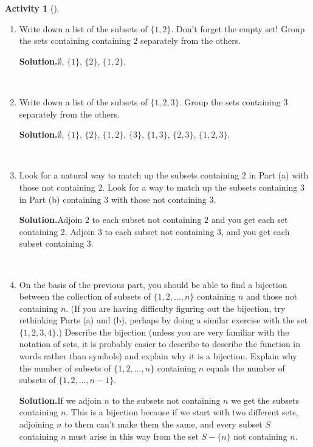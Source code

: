 \documentclass[10pt,]{book}
\theoremstyle{plain}
\theoremstyle{definition}
\newtheorem{activity}[project]{Activity}
\numberwithin{equation}{chapter}
\begin{document}
\begin{activity}[]\label{subsetsbysmallestcounterexample}
~\par
\begin{enumerate}[label=(\alph*)]
 \item Write down a list of the subsets of \(\{ 1, 2 \}\). Don't forget the empty set! Group the sets containing containing 2 separately from the others.%
\par\medskip\noindent%
\textbf{Solution.}\quad \(\emptyset\), \(\{1\}\), \(\{2\}\), \(\{1, 2\}\).%

~\par
\item Write down a list of the subsets of \(\{ 1, 2, 3 \}\). Group the sets containing 3 separately from the others.%
\par\medskip\noindent%
\textbf{Solution.}\quad \(\emptyset\), \(\{1\}\), \(\{2\}\), \(\{1, 2\}\), \(\{3\}\), \(\{1,3\}\), \(\{2,3\}\), \(\{1,2,3\}\).%

~\par
\item Look for a natural way to match up the subsets containing 2 in Part (a) with those not containing 2. Look for a way to match up the subsets containing 3 in Part (b) containing 3 with those not containing 3.%
\par\medskip\noindent%
\textbf{Solution.}\quad Adjoin \(2\) to each subset not containing \(2\) and you get each set containing 2. Adjoin 3 to each subset not containing 3, and you get each subset containing 3.%

~\par
\item On the basis of the previous part, you should be able to find a bijection between the collection of subsets of \(\{1, 2, \ldots , n \}\) containing \(n\) and those not containing \(n\). (If you are having difficulty figuring out the bijection, try rethinking Parts (a) and (b), perhaps by doing a similar exercise with the set \(\{1,2,3,4\}\).) Describe the bijection (unless you are very familiar with the notation of sets, it is probably easier to describe to describe the function in words rather than symbols) and explain why it is a bijection. Explain why the number of subsets of \(\{ 1, 2, \ldots , n \}\) containing \(n\) equals the number of subsets of \(\{ 1, 2, \ldots, n-1 \}\).%
\par\medskip\noindent%
\textbf{Solution.}\quad If we adjoin \(n\) to the subsets not containing \(n\) we get the subsets containing \(n\). This is a bijection because if we start with two different sets, adjoining \(n\) to them can't make them the same, and every subset \(S\) containing \(n\) must arise in this way from the set \(S-\{n\}\) not containing \(n\).%


\end{enumerate}
\end{activity}
\end{document}
